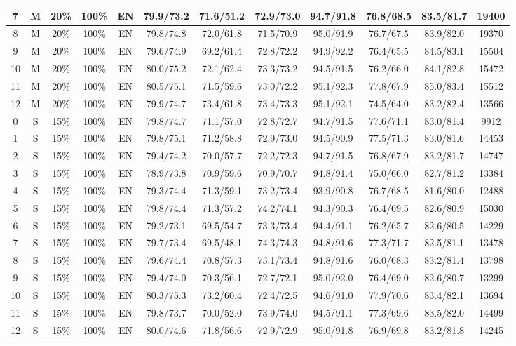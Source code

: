 \begin{table*}
{\begin{tabular}{|c|c|c|c|c||c|c|c|c|c|c||c|}
7 & M & 20\% & 100\% & EN & 79.9/73.2 & 71.6/51.2 & 72.9/73.0 & 94.7/91.8 & 76.8/68.5 & 83.5/81.7 & 19400 \\ \hline
8 & M & 20\% & 100\% & EN & 79.8/74.8 & 72.0/61.8 & 71.5/70.9 & 95.0/91.9 & 76.7/67.5 & 83.9/82.0 & 19370 \\ \hline
9 & M & 20\% & 100\% & EN & 79.6/74.9 & 69.2/61.4 & 72.8/72.2 & 94.9/92.2 & 76.4/65.5 & 84.5/83.1 & 15504 \\ \hline
10 & M & 20\% & 100\% & EN & 80.0/75.2 & 72.1/62.4 & 73.3/73.2 & 94.5/91.5 & 76.2/66.0 & 84.1/82.8 & 15472 \\ \hline
11 & M & 20\% & 100\% & EN & 80.5/75.1 & 71.5/59.6 & 73.0/72.2 & 95.1/92.3 & 77.8/67.9 & 85.0/83.4 & 15512 \\ \hline
12 & M & 20\% & 100\% & EN & 79.9/74.7 & 73.4/61.8 & 73.4/73.3 & 95.1/92.1 & 74.5/64.0 & 83.2/82.4 & 13566 \\ \hline
0 & S & 15\% & 100\% & EN & 79.8/74.7 & 71.1/57.0 & 72.8/72.7 & 94.7/91.5 & 77.6/71.1 & 83.0/81.4 & 9912 \\ \hline
1 & S & 15\% & 100\% & EN & 79.8/75.1 & 71.2/58.8 & 72.9/73.0 & 94.5/90.9 & 77.5/71.3 & 83.0/81.6 & 14453 \\ \hline
2 & S & 15\% & 100\% & EN & 79.4/74.2 & 70.0/57.7 & 72.2/72.3 & 94.7/91.5 & 76.8/67.9 & 83.2/81.7 & 14747 \\ \hline
3 & S & 15\% & 100\% & EN & 78.9/73.8 & 70.9/59.6 & 70.9/70.7 & 94.8/91.4 & 75.0/66.0 & 82.7/81.2 & 13384 \\ \hline
4 & S & 15\% & 100\% & EN & 79.3/74.4 & 71.3/59.1 & 73.2/73.4 & 93.9/90.8 & 76.7/68.5 & 81.6/80.0 & 12488 \\ \hline
5 & S & 15\% & 100\% & EN & 79.8/74.4 & 71.3/57.2 & 74.2/74.1 & 94.3/90.3 & 76.4/69.5 & 82.6/80.9 & 15030 \\ \hline
6 & S & 15\% & 100\% & EN & 79.2/73.1 & 69.5/54.7 & 73.3/73.4 & 94.4/91.1 & 76.2/65.7 & 82.6/80.5 & 14229 \\ \hline
7 & S & 15\% & 100\% & EN & 79.7/73.4 & 69.5/48.1 & 74.3/74.3 & 94.8/91.6 & 77.3/71.7 & 82.5/81.1 & 13478 \\ \hline
8 & S & 15\% & 100\% & EN & 79.6/74.4 & 70.8/57.3 & 73.1/73.4 & 94.8/91.6 & 76.0/68.3 & 83.2/81.4 & 13798 \\ \hline
9 & S & 15\% & 100\% & EN & 79.4/74.0 & 70.3/56.1 & 72.7/72.1 & 95.0/92.0 & 76.4/69.0 & 82.6/80.7 & 13299 \\ \hline
10 & S & 15\% & 100\% & EN & 80.3/75.3 & 73.2/60.4 & 72.4/72.5 & 94.6/91.0 & 77.9/70.6 & 83.4/82.1 & 13694 \\ \hline
11 & S & 15\% & 100\% & EN & 79.8/73.7 & 70.0/52.0 & 73.9/74.0 & 94.5/91.1 & 77.3/69.6 & 83.5/82.0 & 14499 \\ \hline
12 & S & 15\% & 100\% & EN & 80.0/74.6 & 71.8/56.6 & 72.9/72.9 & 95.0/91.8 & 76.9/69.8 & 83.2/81.8 & 14245 \\ \hline
\end{tabular}}
\end{table*}

